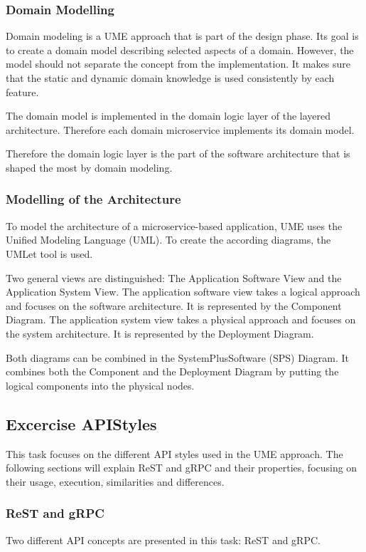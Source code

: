 \subsubsection*{Domain Modelling}
Domain modeling is a UME approach that is part of the design phase.
Its goal is to create a domain model describing selected aspects of a domain.
However, the model should not separate the concept from the implementation.
It makes sure that the static and dynamic domain knowledge is used consistently by each feature.

The domain model is implemented in the domain logic layer of the layered architecture.
Therefore each domain microservice implements its domain model.

Therefore the domain logic layer is the part of the software architecture that is shaped the most by domain modeling.

\subsubsection*{Modelling of the Architecture}
To model the architecture of a microservice-based application, UME uses the Unified Modeling Language (UML).
To create the according diagrams, the UMLet tool \cite{UML-WEB} is used.

Two general views are distinguished: The Application Software View and the Application System View.
The application software view takes a logical approach and focuses on the software architecture.
It is represented by the Component Diagram.
The application system view takes a physical approach and focuses on the system architecture.
It is represented by the Deployment Diagram.

Both diagrams can be combined in the SystemPlusSoftware (SPS) Diagram.
It combines both the Component and the Deployment Diagram by putting the logical components into the physical nodes.

\subsection{Excercise APIStyles}
\label{sec:api_styles}
This task focuses on the different API styles used in the UME approach.
The following sections will explain ReST and gRPC and their properties, focusing on their usage, execution, similarities and differences.

\subsubsection*{ReST and gRPC}
\label{subsec:rest_and_grpc}
Two different API concepts are presented in this task: ReST and gRPC.

